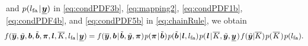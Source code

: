 \documentclass[11pt,a4paper]{article}
\newcommand{\ist}{\hspace*{.3mm}}
\newcommand{\nn}{\nonumber}
\newcommand{\Knew}{\overline{K}}
\newcommand{\yt}{\tilde{\V{y}}}
\begin{document}
and $p(l_{\mathrm{fa}} \ist | \ist \underline{\V{y}} )$  in  \eqref{eq:condPDF3b}, \eqref{eq:mapping2}, \eqref{eq:condPDF1b}, \eqref{eq:condPDF4b}, and \eqref{eq:condPDF5b} in \eqref{eq:chainRule}, we obtain
\begin{align}
\hspace{-1mm} f(\overline{\V{y}}, \tilde{\V{y}}, \V{b}, \tilde{\V{b}}, \V{\pi}, \V{l}, \overline{K}, l_{\mathrm{fa}} \ist | \ist \underline{\V{y}})  &= f(\overline{\V{y}}, \V{b} \ist | \ist \tilde{\V{b}},\tilde{\V{y}},\V{\pi}) \ist p( \V{\pi} \ist | \ist \tilde{\V{b}})\ist p(\tilde{\V{b}} \ist | \ist \V{l},  l_{\mathrm{fa}}) \ist p( \ist \V{l} \ist | \ist \overline{K}, \tilde{\V{y}},  \underline{\V{y}} \ist) \ist f(\yt | \Knew)  \ist p( \ist \overline{K} \ist)  \ist p(l_{\mathrm{fa}} ). \label{eq:chainRule2}  \\[-5mm]
\nn
\end{align}
\end{document}
